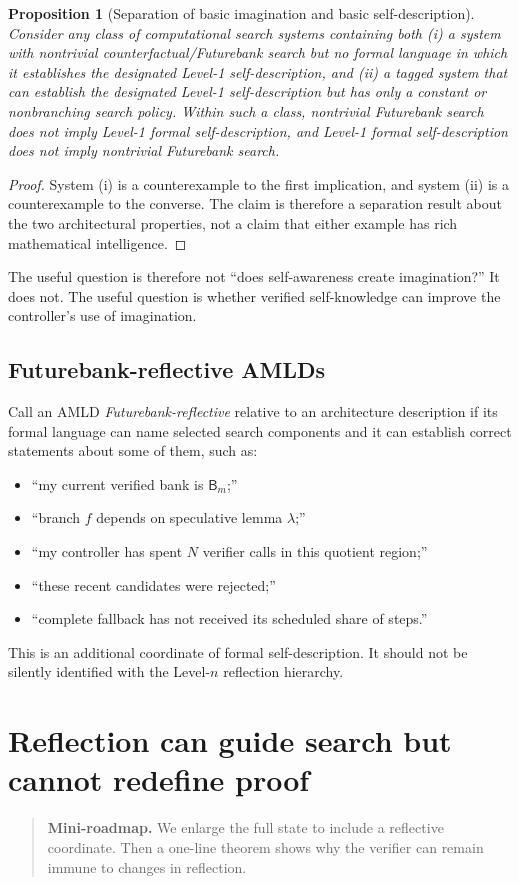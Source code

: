 \documentclass[11pt,openany]{book}
\newtheorem{proposition}[theorem]{Proposition}
\theoremstyle{definition}
\theoremstyle{remark}
\newenvironment{miniroadmap}{\begin{quote}\small\color{deepblue}\textbf{Mini-roadmap.} }{\end{quote}}
\newcommand{\Bank}{\mathsf{B}}
\begin{document}
\begin{proposition}[Separation of basic imagination and basic self-description]\label{prop:independentaxes}
Consider any class of computational search systems containing both (i) a system with nontrivial counterfactual/Futurebank search but no formal language in which it establishes the designated Level-1 self-description, and (ii) a tagged system that can establish the designated Level-1 self-description but has only a constant or nonbranching search policy. Within such a class, nontrivial Futurebank search does not imply Level-1 formal self-description, and Level-1 formal self-description does not imply nontrivial Futurebank search.
\end{proposition}
\begin{proof}
System (i) is a counterexample to the first implication, and system (ii) is a counterexample to the converse. The claim is therefore a separation result about the two architectural properties, not a claim that either example has rich mathematical intelligence.
\end{proof}

The useful question is therefore not ``does self-awareness create imagination?'' It does not. The useful question is whether verified self-knowledge can improve the controller's use of imagination.

\section{Futurebank-reflective AMLDs}
Call an AMLD \emph{Futurebank-reflective} relative to an architecture description if its formal language can name selected search components and it can establish correct statements about some of them, such as:
\begin{itemize}
\item ``my current verified bank is $\Bank_m$;''
\item ``branch $f$ depends on speculative lemma $\lambda$;''
\item ``my controller has spent $N$ verifier calls in this quotient region;''
\item ``these recent candidates were rejected;''
\item ``complete fallback has not received its scheduled share of steps.''
\end{itemize}
This is an additional coordinate of formal self-description. It should not be silently identified with the Level-$n$ reflection hierarchy.

\chapter{Reflection can guide search but cannot redefine proof}
\begin{miniroadmap}
We enlarge the full state to include a reflective coordinate. Then a one-line theorem shows why the verifier can remain immune to changes in reflection.
\end{miniroadmap}
\end{document}
